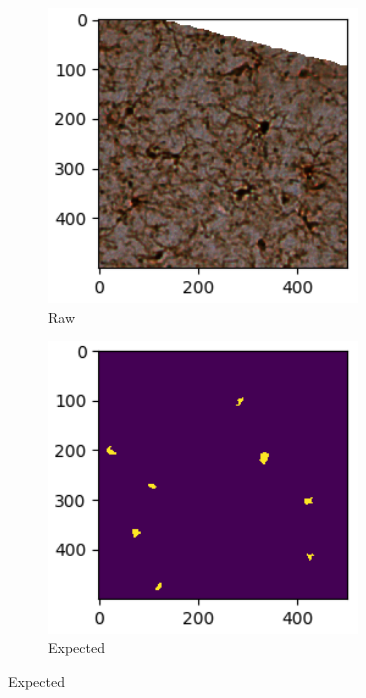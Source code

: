 \documentclass{article}
\begin{document}
\begin{figure}[ht]
  \centering
  \begin{subfigure}{0.24\textwidth}
    \includegraphics[width=0.9\textwidth]{test-sample-raw.png}
    \centering
    \caption{Raw}
  \end{subfigure}%
  \begin{subfigure}{0.24\textwidth}
    \includegraphics[width=0.9\textwidth]{test-sample-seg.png}
    \centering
    \caption{Expected}
  \end{subfigure}%

\end{figure}
\end{document}
